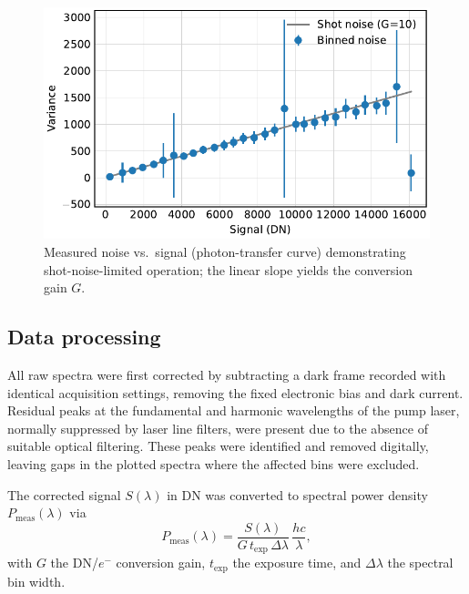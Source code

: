 \documentclass[
	a4paper,
]{scrarticle}
\begin{document}
\begin{figure}[h]
    \centering
    \includegraphics{../analysis/figures/shot noise.pdf}
    \caption{Measured noise vs.\ signal (photon-transfer curve) demonstrating shot-noise-limited operation; the linear slope yields the conversion gain \(G\).}
    \label{fig:shotnoise}
\end{figure}

\subsection{Data processing}
All raw spectra were first corrected by subtracting a dark frame recorded with identical acquisition settings, removing the fixed electronic bias and dark current.  
Residual peaks at the fundamental and harmonic wavelengths of the pump laser, normally suppressed by laser line filters, were present due to the absence of suitable optical filtering.  
These peaks were identified and removed digitally, leaving gaps in the plotted spectra where the affected bins were excluded.  

The corrected signal \(S(\lambda)\) in DN was converted to spectral power density \(P_{\text{meas}}(\lambda)\) via
\begin{equation}
  P_{\text{meas}}(\lambda)
  = \frac{S(\lambda)}{G\,t_{\text{exp}}\,\Delta\lambda}\,\frac{hc}{\lambda},
\end{equation}
with \(G\) the DN/\(e^-\) conversion gain, \(t_{\text{exp}}\) the exposure time, and \(\Delta\lambda\) the spectral bin width.  

\clearpage
\end{document}

